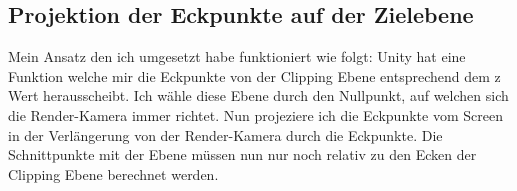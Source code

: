 \subsection{Projektion der Eckpunkte auf der Zielebene}
Mein Ansatz den ich umgesetzt habe funktioniert wie folgt: 
Unity hat eine Funktion welche mir die Eckpunkte von der Clipping Ebene entsprechend dem z Wert herausscheibt. Ich wähle diese Ebene durch den Nullpunkt, auf welchen sich die Render-Kamera immer richtet. 
Nun projeziere ich die Eckpunkte vom Screen in der Verlängerung von der Render-Kamera durch die Eckpunkte. Die Schnittpunkte mit der Ebene müssen nun nur noch relativ zu den Ecken der Clipping Ebene berechnet werden. 






